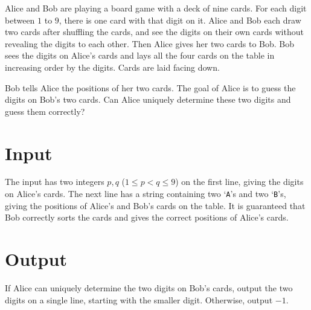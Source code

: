 
Alice and Bob are playing a board game with a deck of nine cards.
For each digit between $1$ to $9$, there is one card with that digit on it.
Alice and Bob each draw two cards after shuffling the cards, and see the digits on their own cards without revealing the digits to each other.
Then Alice gives her two cards to Bob.
Bob sees the digits on Alice's cards and lays all the four cards on the table in increasing order by the digits.
Cards are laid facing down.

Bob tells Alice the positions of her two cards.
The goal of Alice is to guess the digits on Bob's two cards.
Can Alice uniquely determine these two digits and guess them correctly?


\section*{Input}
The input has two integers $p, q$ ($1 \leq p < q \leq 9$) on the first line, giving the digits on Alice's cards.
The next line has a string containing two `{\tt A}'s and two `{\tt B}'s, giving the positions of Alice's and Bob's cards on the table.
It is guaranteed that Bob correctly sorts the cards and gives the correct positions of Alice's cards.

\section*{Output}
If Alice can uniquely determine the two digits on Bob's cards, output the two digits on a single line, starting with the smaller digit.
Otherwise, output $-1$.

